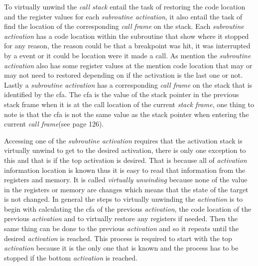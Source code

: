  


To virtually unwind the \emph{call stack} entail the task of restoring the code location and the register values for each \emph{subroutine activation}, it also entail the task of find the location of the corresponding \emph{call frame} on the stack.
Each \emph{subroutine activation} has a code location within the subroutine that show where it stopped for any reason, the reason could be that a breakpoint was hit, it was interrupted by a event or it could be location were it made a call.
As mention the \emph{subroutine activation} also has some register values at the mention code location that may or may not need to restored depending on if the activation is the last one or not.
Lastly a \emph{subroutine activation} has a corresponding \emph{call frame} on the stack that is identified by the \gls{cfa}.
The \gls{cfa} is the value of the stack pointer in the previous stack frame when it is at the call location of the current \emph{stack frame}, one thing to note is that the \gls{cfa} is not the same value as the stack pointer when entering the current \emph{call frame}(see \cite{dwarf} page 126).


Accessing one of the \emph{subroutine activation} requires that the activation stack is virtually unwind to get to the desired activation, there is only one exception to this and that is if the top activation is desired.
That is because all of \emph{activation} information location is known thus it is easy to read that information from the registers and memory. 
It is called \emph{virtually unwinding} because none of the value in the registers or memory are changes which means that the state of the target is not changed.
In general the steps to virtually unwinding the \emph{activation} is to begin with calculating the \gls{cfa} of the previous \emph{activation}, the code location of the previous \emph{activation} and to virtually restore any registers if needed.
Then the same thing can be done to the previous \emph{activation} and so it repeats until the desired \emph{activation} is reached.
This process is required to start with the top \emph{activation} because it is the only one that is known and the process has 
to be stopped if the bottom \emph{activation} is reached.


